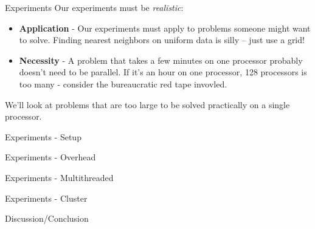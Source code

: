 \documentclass[pdf,colorBG,slideColor]{prosper}
\newcommand{\itemt}[1]{\item {\bf #1} -}
\begin{document}
\begin{slide}{Experiments}
  Our experiments must be {\em realistic}:
  \begin{itemize}
    \itemt{Application} Our experiments must apply to problems someone
    might want to solve.  Finding nearest neighbors on uniform data is
    silly -- just use a grid!
    \itemt{Necessity}
    A problem that takes a few minutes on one processor probably
    doesn't need to be parallel.
    If it's an hour on one processor, 128 processors is too many - consider
    the bureaucratic red tape invovled.
  \end{itemize}
  We'll look at problems that are too large to be solved practically on
  a single processor.
\end{slide}

\begin{slide}{Experiments - Setup}
\end{slide}

\begin{slide}{Experiments - Overhead}
\end{slide}

\begin{slide}{Experiments - Multithreaded}
\end{slide}

\begin{slide}{Experiments - Cluster}
\end{slide}

\begin{slide}{Discussion/Conclusion}
\end{slide}
\end{document}
